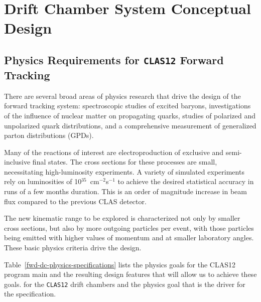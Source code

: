 \section{Drift Chamber System Conceptual Design}



\subsection{Physics Requirements for {\tt CLAS12} Forward Tracking}

There are several broad areas of physics research that drive 
the design of the forward tracking system: 
spectroscopic studies of excited baryons, investigations of 
the influence of nuclear matter on propagating quarks, studies of polarized 
and unpolarized quark distributions, and a comprehensive measurement of 
generalized parton distributions (GPDs). 

Many of the reactions of interest 
are electroproduction of exclusive and semi-inclusive final states.  The 
cross sections for these processes are small, necessitating high-luminosity 
experiments.  A variety of simulated experiments rely on luminosities of 
10$^{35}$~cm$^{-2}$s$^{-1}$ to achieve the desired statistical accuracy in 
runs of a few months duration.  This is an order of magnitude increase
in beam flux compared to the previous CLAS detector.  

The new kinematic range to be explored is 
characterized not only by smaller cross sections, but also by more outgoing 
particles per event, with those particles being emitted with higher values 
of momentum and at smaller laboratory angles.  These basic physics criteria 
drive the design. 


Table~\ref{fwd-dc-physics-specifications} lists the physics goals for the CLAS12 program
main and the resulting design features that will allow us to achieve these goals. for 
the {\tt CLAS12} drift chambers and the physics goal that is the driver
for the specification.  


